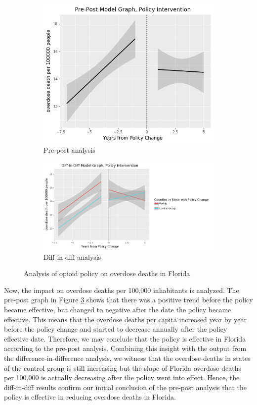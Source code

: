 \documentclass[12pt,letterpaper]{article}
\begin{document}
\begin{figure}[!h]
\centering
\begin{subfigure}{.5\textwidth}
  \centering
  \includegraphics[width=0.7\linewidth]{../30_results/General_Results/florida_overdose_death_prepost.png}
  \caption{Pre-post analysis}
  \label{fig:fl_death_prepost}
\end{subfigure}%
\begin{subfigure}{.55\textwidth}
  \centering
  \includegraphics[width=1\linewidth]{../30_results/General_Results/florida_overdose_death_diffdiff.png}
  \caption{Diff-in-diff analysis}
  \label{fig:fl_death_did}
\end{subfigure}
\caption{Analysis of opioid policy on overdose deaths in Florida}
\label{fig:fl_death}
\end{figure}


Now, the impact on overdose deaths per 100,000 inhabitants is analyzed. The pre-post graph in Figure \ref{fig:fl_death} shows that there was a positive trend before the policy became effective, but changed to negative after the date the policy became effective. This means that the overdose deaths per capita increased year by year before the policy change and started to decrease annually after the policy effective date. Therefore, we may conclude that the policy is effective in Florida according to the pre-post analysis. Combining this insight with the output from the difference-in-difference analysis, we witness that the overdose deaths in states of the control group is still increasing but the slope of Florida overdose deaths per 100,000 is actually decreasing after the policy went into effect. Hence, the diff-in-diff results confirm our initial conclusion of the pre-post analysis that the policy is effective in reducing overdose deaths in Florida.
\end{document}
